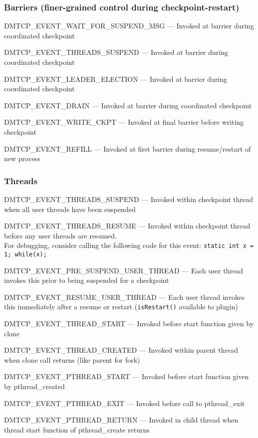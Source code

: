 \documentclass{article}
\begin{document}
\subsubsection*{Barriers (finer-grained control during checkpoint-restart)}
\begin{list}{}{\leftmargin=3em \itemindent=-2em}
\item
  DMTCP\_EVENT\_WAIT\_FOR\_SUSPEND\_MSG --- Invoked at barrier during
coordinated checkpoint
\item
  DMTCP\_EVENT\_THREADS\_SUSPEND --- Invoked at barrier during coordinated checkpoint
\item
  DMTCP\_EVENT\_LEADER\_ELECTION --- Invoked at barrier during coordinated checkpoint
\item
  DMTCP\_EVENT\_DRAIN --- Invoked at barrier during coordinated checkpoint
\item
  DMTCP\_EVENT\_WRITE\_CKPT --- Invoked at final barrier before writing checkpoint
\item
  DMTCP\_EVENT\_REFILL --- Invoked at first barrier during resume/restart of new process
\end{list}

\subsubsection*{Threads}
\begin{list}{}{\leftmargin=3em \itemindent=-2em}
\item
  DMTCP\_EVENT\_THREADS\_SUSPEND --- Invoked within checkpoint thread
	when all user threads have been suspended
\item
  DMTCP\_EVENT\_THREADS\_RESUME --- Invoked within checkpoint thread before
	any user threads are resumed. \\
	For debugging, consider calling the following code for this
        event:  {\tt static int x = 1; while(x);}
\item
  DMTCP\_EVENT\_PRE\_SUSPEND\_USER\_THREAD --- Each user thread invokes this prior
	to being suspended for a checkpoint
\item
  DMTCP\_EVENT\_RESUME\_USER\_THREAD --- Each user thread invokes this immediately
	after a resume or restart ({\tt isRestart()} available to plugin)
\item
  DMTCP\_EVENT\_THREAD\_START --- Invoked before start function given by clone
\item
  DMTCP\_EVENT\_THREAD\_CREATED --- Invoked within parent thread when clone call returns  (like parent for fork)
\item
  DMTCP\_EVENT\_PTHREAD\_START --- Invoked before start function given by pthread\_created
\item
  DMTCP\_EVENT\_PTHREAD\_EXIT --- Invoked before call to pthread\_exit
\item
  DMTCP\_EVENT\_PTHREAD\_RETURN --- Invoked in child thread when thread start function of pthread\_create returns
\item
\end{list}
\end{document}
